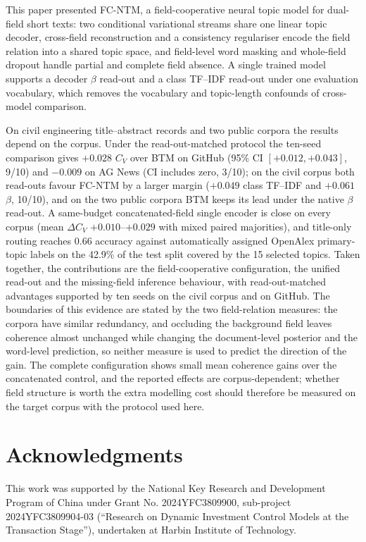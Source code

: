 \documentclass[Journal,letterpaper,NoLists]{ascelike-new}
\begin{document}
This paper presented FC-NTM, a field-cooperative neural topic model for dual-field short texts:
two conditional variational streams share one linear topic decoder, cross-field reconstruction and a
consistency regulariser encode the field relation into a shared topic space, and field-level word
masking and whole-field dropout handle partial and complete field absence. A single trained model
supports a decoder $\beta$ read-out and a class TF--IDF read-out under one evaluation vocabulary,
which removes the vocabulary and topic-length confounds of cross-model comparison.

On civil engineering title--abstract records and two public corpora the results depend on the
corpus. Under the read-out-matched protocol the ten-seed comparison gives $+0.028$ $C_V$ over BTM on
GitHub (95\% CI $[+0.012,+0.043]$, 9/10) and $-0.009$ on AG News (CI includes zero, 3/10); on the
civil corpus both read-outs favour FC-NTM by a larger margin ($+0.049$ class TF--IDF and
$+0.061$ $\beta$, 10/10), and on the two public corpora BTM keeps its lead under the native $\beta$ read-out. A same-budget concatenated-field single encoder is close on every corpus (mean
$\Delta C_V$ $+0.010$--$+0.029$ with mixed paired majorities), and title-only routing reaches
0.66 accuracy against automatically assigned OpenAlex primary-topic labels on the 42.9\% of the test
split covered by the 15 selected topics. Taken together, the contributions are the field-cooperative configuration, the unified read-out
and the missing-field inference behaviour, with read-out-matched advantages supported by ten seeds on
the civil corpus and on GitHub. The boundaries of this evidence are stated by the two field-relation
measures: the corpora have similar redundancy, and occluding the background field leaves coherence
almost unchanged while changing the document-level posterior and the word-level prediction, so neither
measure is used to predict the direction of the gain. The complete configuration shows small mean
coherence gains over the concatenated control, and the reported effects are corpus-dependent;
whether field structure is worth the extra modelling cost should therefore be measured on the
target corpus with the protocol used here.

\section{Acknowledgments}

This work was supported by the National Key Research and Development Program of China under
Grant No. 2024YFC3809900, sub-project 2024YFC3809904-03 (``Research on Dynamic Investment
Control Models at the Transaction Stage''), undertaken at Harbin Institute of Technology.
\end{document}
